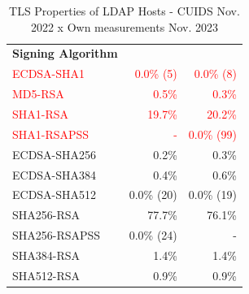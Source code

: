 \begin{table}[!ht]
\begin{tabular}{l r r}
\hline
\textbf{Signing Algorithm} \\
\textcolor{red}{ECDSA-SHA1} & \textcolor{red}{0.0\% (5)} & \textcolor{red}{0.0\% (8)} \\
\textcolor{red}{MD5-RSA} & \textcolor{red}{0.5\%} & \textcolor{red}{0.3\%} \\
\textcolor{red}{SHA1-RSA} & \textcolor{red}{19.7\%} & \textcolor{red}{20.2\%} \\
\textcolor{red}{SHA1-RSAPSS} & \textcolor{red}{-} & \textcolor{red}{0.0\% (99)} \\
\textcolor{green!60!black}{ECDSA-SHA256} & \textcolor{green!60!black}{0.2\%} & \textcolor{green!60!black}{0.3\%} \\
\textcolor{green!60!black}{ECDSA-SHA384} & \textcolor{green!60!black}{0.4\%} & \textcolor{green!60!black}{0.6\%} \\
\textcolor{green!60!black}{ECDSA-SHA512} & \textcolor{green!60!black}{0.0\% (20)} & \textcolor{green!60!black}{0.0\% (19)} \\
\textcolor{green!60!black}{SHA256-RSA} & \textcolor{green!60!black}{77.7\%} & \textcolor{green!60!black}{76.1\%} \\
\textcolor{green!60!black}{SHA256-RSAPSS} & \textcolor{green!60!black}{0.0\% (24)} & \textcolor{green!60!black}{-} \\
\textcolor{green!60!black}{SHA384-RSA} & \textcolor{green!60!black}{1.4\%} & \textcolor{green!60!black}{1.4\%} \\
\textcolor{green!60!black}{SHA512-RSA} & \textcolor{green!60!black}{0.9\%} & \textcolor{green!60!black}{0.9\%} \\


\hline
\end{tabular}
\caption{TLS Properties of LDAP Hosts - \gls{CUIDS} Nov. 2022 x Own measurements Nov. 2023}
\label{tab:tls_properties_table}
\end{table}